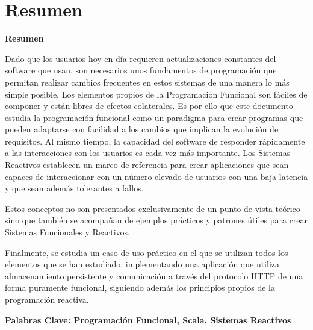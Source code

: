 \documentclass[../main.tex]{subfiles}
\begin{document}
\makeatletter
\renewenvironment{abstract}{%
    \if@twocolumn
      \section*{Resumen \\}%
    \else %
    \begin{flushright}
        {\filleft\Huge\bfseries\fontsize{48pt}{12}\selectfont Resumen\vspace{\z@}}%
        \end{flushright}
      \quotation
    \fi}
    {\if@twocolumn\else\endquotation\fi}
\makeatother
\begin{abstract}
Dado que los usuarios hoy en día requieren actualizaciones constantes del software que usan, 
son necesarios unos fundamentos de programación que permitan realizar cambios frecuentes 
en estos sistemas de una manera lo más simple posible. Los elementos propios de la Programación Funcional 
son fáciles de componer y están libres de efectos colaterales. Es por ello que este documento 
estudia la programación funcional como un paradigma para crear programas que pueden adaptarse 
con facilidad a los cambios que implican la evolución de requisitos. Al mismo tiempo, 
la capacidad del software de responder rápidamente a las interacciones con los usuarios 
es cada vez más importante. Los Sistemas Reactivos establecen un marco de referencia 
para crear aplicaciones que sean capaces de interaccionar con un número elevado de usuarios
con una baja latencia y que sean además tolerantes a fallos.

Estos conceptos no son presentados exclusivamente de un punto de vista teórico sino 
que también se acompañan de ejemplos prácticos y patrones útiles para crear Sistemas 
Funcionales y Reactivos.

Finalmente, se estudia un caso de uso práctico en el que se utilizan todos los elementos 
que se han estudiado, implementando una aplicación que utiliza almacenamiento persistente 
y comunicación a través del protocolo HTTP de una forma puramente funcional, siguiendo además
los principios propios de la programación reactiva.

\bfseries{\large{Palabras Clave:}} Programación Funcional, Scala, Sistemas Reactivos

\end{abstract}
\end{document}
